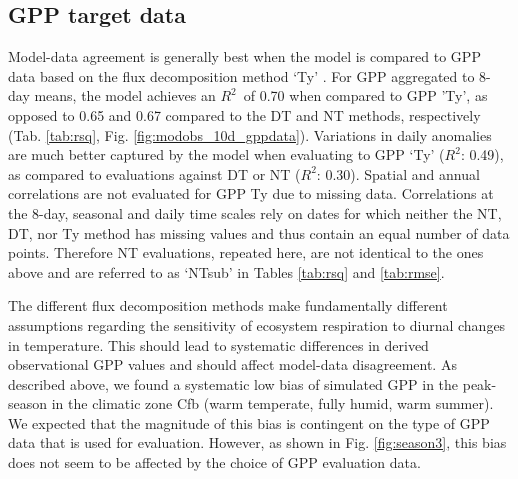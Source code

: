 \documentclass{myreport}
\newcommand{\rsq}{$R^2$}
\begin{document}
\clearpage

\subsection{GPP target data}
\label{sec:results_gppdata}

Model-data agreement is generally best when the model is compared to GPP data based on the flux decomposition method `Ty' \citep{wang17natpl}. For GPP aggregated to 8-day means, the model achieves an \rsq\ of 0.70 when compared to GPP 'Ty', as opposed to 0.65 and 0.67 compared to the DT and NT methods, respectively (Tab. \ref{tab:rsq}, Fig. \ref{fig:modobs_10d_gppdata}). Variations in daily anomalies are much better captured by the model when evaluating to GPP `Ty' (\rsq : 0.49), as compared to evaluations against DT or NT (\rsq : 0.30). Spatial and annual correlations are not evaluated for GPP Ty due to missing data. Correlations at the 8-day, seasonal and daily time scales rely on dates for which neither the NT, DT, nor Ty method has missing values and thus contain an equal number of data points. Therefore NT evaluations, repeated here, are not identical to the ones above and are referred to as `NTsub' in Tables \ref{tab:rsq} and \ref{tab:rmse}. 

The different flux decomposition methods make fundamentally different assumptions regarding the sensitivity of ecosystem respiration to diurnal changes in temperature. This should lead to systematic differences in derived observational GPP values and should affect model-data disagreement. As described above, we found a systematic low bias of simulated GPP in the peak-season in the climatic zone Cfb (warm temperate, fully humid, warm summer). We expected that the magnitude of this bias is contingent on the type of GPP data that is used for evaluation. However, as shown in Fig. \ref{fig:season3}, this bias does not seem to be affected by the choice of GPP evaluation data.
\end{document}
